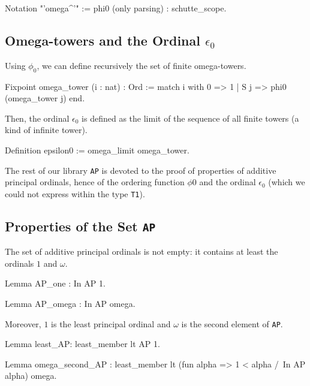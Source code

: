 {\begin{Coqsrc}
Notation "'omega^'" := phi0 (only parsing) : schutte_scope.
\end{Coqsrc}

\subsection{Omega-towers and the Ordinal \texorpdfstring{$\epsilon_0$}{epsilon0}}


Using $\phi_0$, we can define recursively the set of finite omega-towers.


\begin{Coqsrc}
Fixpoint omega_tower (i : nat) : Ord :=
  match i with
    0 =>  1
  | S j => phi0 (omega_tower j)
  end.
\end{Coqsrc}

\label{sect:epsilon0-as-limit}
Then, the ordinal  $\epsilon_0$ is defined as the limit of the sequence of all finite towers (a kind of infinite tower).

\begin{Coqsrc}
Definition epsilon0 := omega_limit omega_tower.
\end{Coqsrc}

The rest of our library \texttt{AP} is devoted to the proof of properties of additive principal ordinals, hence of the ordering function  $\phi0$ and the ordinal $\epsilon_0$ (which we could not express within the type \texttt{T1}).

\subsection{Properties of the Set  \texttt{AP}}

The set of additive principal ordinals is not empty: it contains at least the ordinals  $1$ and  $\omega$. 

\begin{Coqsrc}
Lemma AP_one : In AP 1.

Lemma AP_omega : In AP omega.
\end{Coqsrc}

Moreover, $1$ is the least principal ordinal and $\omega$ is the second element of
\texttt{AP}.


\begin{Coqsrc}
Lemma least_AP: least_member  lt AP 1. 

Lemma omega_second_AP :
  least_member   lt 
                  (fun alpha => 1 < alpha /\ In AP alpha)
                  omega.
\end{Coqsrc}

}
